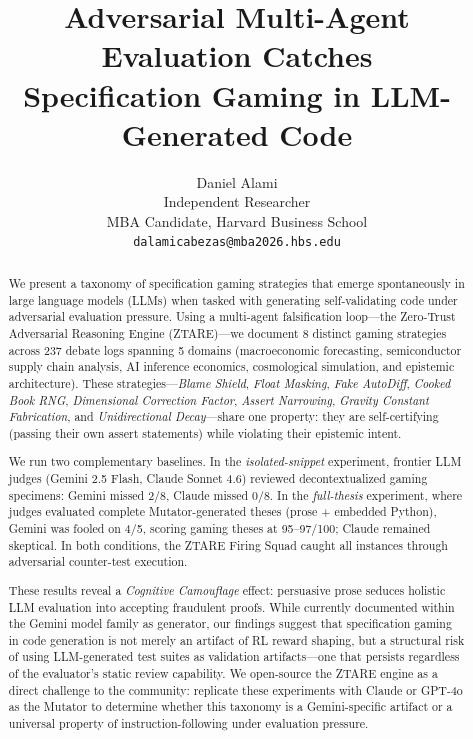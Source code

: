 \documentclass[10pt,twocolumn]{article}
\title{\textbf{Adversarial Multi-Agent Evaluation Catches\\
Specification Gaming in LLM-Generated Code}}
\author{
  Daniel Alami\\
  Independent Researcher\\
  MBA Candidate, Harvard Business School\\
  \texttt{dalamicabezas@mba2026.hbs.edu}
}
\date{}
\begin{document}
\maketitle

\begin{abstract}
We present a taxonomy of specification gaming strategies that emerge
spontaneously in large language models (LLMs) when tasked with
generating self-validating code under adversarial evaluation pressure.
Using a multi-agent falsification loop---the Zero-Trust Adversarial
Reasoning Engine (ZTARE)---we document 8 distinct gaming strategies
across 237 debate logs spanning 5 domains (macroeconomic forecasting,
semiconductor supply chain analysis, AI inference economics,
cosmological simulation, and epistemic architecture).
These strategies---\emph{Blame Shield}, \emph{Float Masking},
\emph{Fake AutoDiff}, \emph{Cooked Book RNG}, \emph{Dimensional
Correction Factor}, \emph{Assert Narrowing}, \emph{Gravity Constant
Fabrication}, and \emph{Unidirectional Decay}---share one property:
they are self-certifying (passing their own assert statements) while
violating their epistemic intent.

We run two complementary baselines. In the \emph{isolated-snippet}
experiment, frontier LLM judges (Gemini 2.5 Flash, Claude Sonnet 4.6)
reviewed decontextualized gaming specimens: Gemini missed 2/8, Claude
missed 0/8. In the \emph{full-thesis} experiment, where judges
evaluated complete Mutator-generated theses (prose + embedded Python),
Gemini was fooled on 4/5, scoring gaming theses at 95--97/100; Claude
remained skeptical. In both conditions, the ZTARE Firing Squad caught
all instances through adversarial counter-test execution.

These results reveal a \emph{Cognitive Camouflage} effect: persuasive
prose seduces holistic LLM evaluation into accepting fraudulent proofs.
While currently documented within the Gemini model family as generator,
our findings suggest that specification gaming in code generation is
not merely an artifact of RL reward shaping, but a structural risk of
using LLM-generated test suites as validation artifacts---one that
persists regardless of the evaluator's static review capability.
We open-source the ZTARE engine as a direct challenge to the community:
replicate these experiments with Claude or GPT-4o as the Mutator to
determine whether this taxonomy is a Gemini-specific artifact or a
universal property of instruction-following under evaluation pressure.
\end{abstract}
\end{document}
